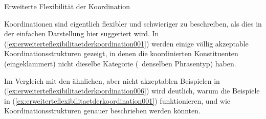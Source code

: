 \begin{Vertiefung}{Erweiterte Flexibilität der Koordination}
\label{vert:erweiterteflexibilitaetderkoordination}

\noindent Koordinationen sind eigentlich flexibler und schwieriger zu beschreiben, als dies in der einfachen Darstellung hier suggeriert wird.
In (\ref{ex:erweiterteflexibilitaetderkoordination001}) werden einige völlig akzeptable Koordinationsstrukturen gezeigt, in denen die koordinierten Konstituenten (eingeklammert) nicht dieselbe Kategorie (\zB\ denselben Phrasentyp) haben.

\begin{exe}
  \ex\label{ex:erweiterteflexibilitaetderkoordination001} 
  \begin{xlist}
  \end{xlist}
\end{exe}

Im Vergleich mit den ähnlichen, aber nicht akzeptablen Beispielen in (\ref{ex:erweiterteflexibilitaetderkoordination006}) wird deutlich, warum die Beispiele in (\ref{ex:erweiterteflexibilitaetderkoordination001}) funktionieren, und wie Koordinationsstrukturen genauer beschrieben werden könnten.

\begin{exe}
  \ex\label{ex:erweiterteflexibilitaetderkoordination006} 
  \begin{xlist}
  \end{xlist}
\end{exe}


\end{Vertiefung}
